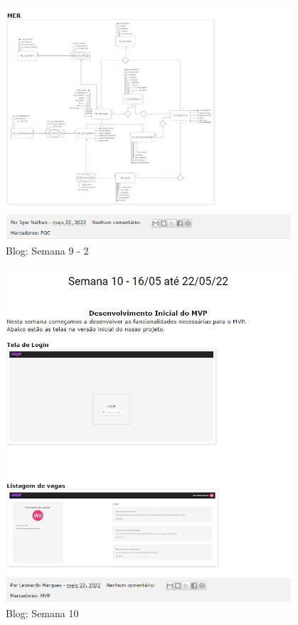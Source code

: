 \begin{apendicesenv}
\begin{figure}[H]
\end{figure}
\begin{figure}[H]
	\centering
	\caption{Blog: Semana 9 - 2}
	\includegraphics[width=0.95\textwidth]{../imagens/blog-posts/semana09-2.png}
\end{figure}
\begin{figure}[H]
	\centering
	\caption{Blog: Semana 10}
	\includegraphics[width=0.95\textwidth]{../imagens/blog-posts/semana10.png}

\end{figure}
\end{apendicesenv}

